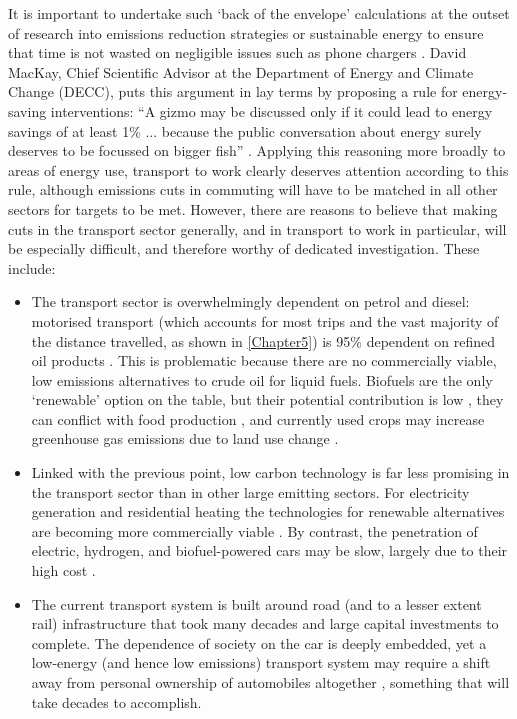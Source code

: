 \documentclass[a4paper, 11pt, twoside]{Thesis}
\begin{document}
It is important to undertake such `back of the
envelope' calculations at the outset of research into emissions reduction
strategies or sustainable energy to ensure that time is not wasted on negligible
issues such as phone chargers \citep{MacKay2009}. David MacKay, Chief Scientific
Advisor at the Department of Energy and Climate Change (DECC), puts this
argument in lay terms by proposing a rule for
energy-saving interventions: ``A gizmo may be discussed only if it could lead to
energy savings of at least 1\% ... because the public conversation about energy
surely deserves to be
focussed on bigger fish'' \citep{MacKay2009-energyplates}. Applying this
reasoning more broadly to areas of energy use, transport to work clearly
deserves attention according to
this rule, although emissions cuts in commuting will have to be matched in all
other sectors for targets to be met. However, there are reasons to believe that
making cuts in the transport sector generally, and in transport to work in
particular, will be especially difficult, and therefore worthy of dedicated
investigation. These include:
\begin{itemize}
\item The transport sector is overwhelmingly dependent on petrol and diesel:
motorised transport (which accounts for most trips and the vast majority of the
distance travelled, as shown in \cref{Chapter5}) is 95\% 
dependent on refined oil products \citep{Woodcock2007}. This is problematic
because there are no commercially viable, low emissions alternatives to crude
oil for liquid fuels. Biofuels are the only `renewable' option on the table,
but their potential contribution is low \citep{Patzek2006,Michel2012}, they
can conflict with
food production \citep{Pimentel2009}, and currently used crops may increase
greenhouse gas emissions due to land use change \citep{Fargione2008}.
\item Linked with the previous point, low carbon technology is far less
promising in the transport sector than in other large emitting sectors.
For electricity generation and residential heating the technologies
for renewable alternatives are becoming more commercially viable \citep{Chu2012}.
By contrast,
the penetration of electric, hydrogen, and biofuel-powered cars may be slow,
largely due to their high cost \citep{Proost2011,AdamVaughan2011}.
\item The current transport system is built around road (and to a lesser extent
rail) infrastructure that took many decades and large capital investments to
complete. The dependence of society on the car is deeply embedded, yet a
low-energy (and hence low emissions) transport system may require a shift away
from personal ownership of automobiles altogether
\citep{MacKay2009,Moriarty2010}, something that will take decades to accomplish.
\end{itemize}
\end{document}
